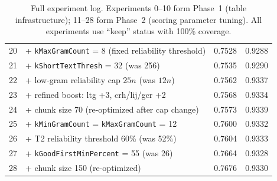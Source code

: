 \documentclass{article}
\begin{document}
\begin{table}[h]
\begin{tabular}{@{}rp{10cm}cc@{}}
20 & + \texttt{kMaxGramCount} = 8 (fixed reliability threshold) & 0.7528 & 0.9288 \\
21 & + \texttt{kShortTextThresh} = 32 (was 256) & 0.7535 & 0.9290 \\
22 & + low-gram reliability cap $25n$ (was $12n$) & 0.7562 & 0.9337 \\
23 & + refined boost: ltg +3, crh/lij/gcr +2 & 0.7568 & 0.9334 \\
24 & + chunk size 70 (re-optimized after cap change) & 0.7573 & 0.9339 \\
25 & + \texttt{kMinGramCount} = \texttt{kMaxGramCount} = 12 & 0.7600 & 0.9332 \\
26 & + T2 reliability threshold 60\% (was 52\%) & 0.7604 & 0.9333 \\
27 & + \texttt{kGoodFirstMinPercent} = 55 (was 26) & 0.7664 & 0.9328 \\
28 & + chunk size 150 (re-optimized) & 0.7676 & 0.9330 \\
\bottomrule
\end{tabular}
\caption{Full experiment log. Experiments 0--10 form Phase~1 (table infrastructure); 11--28 form Phase~2 (scoring parameter tuning). All experiments use ``keep'' status with 100\% coverage.}
\label{tab:fulllog}
\end{table}
\end{document}
